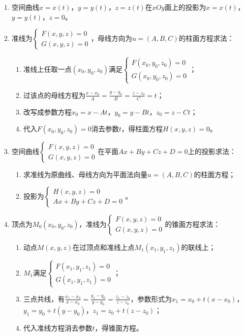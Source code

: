\documentclass[UTF8]{ctexart}
\theoremstyle{remark}
\begin{document}
\begin{enumerate}
\item 空间曲线$x=x(t)$，$y=y(t)$，$z=z(t)$在$xOy$面上的投影为$x=x(t)$，$y=y(t)$，$z=0$。

\item 准线为$\begin{cases}F(x, y, z)=0\\G(x, y, z)=0\end{cases}$，母线方向为$u=(A, B, C)$的柱面方程求法：
\begin{enumerate}
	\item 准线上任取一点$(x_0, y_0, z_0)$满足$\begin{cases}F(x_0, y_0, z_0)=0\\G(x_0, y_0, z_0)=0\end{cases}$；
	\item 过该点的母线方程为$\frac{x-x_0}{A}=\frac{y-y_0}{B}=\frac{z-z_0}{C}=t$；
	\item 改写成参数方程$x_0=x-At$，$y_0=y-Bt$，$z_0=z-Ct$；
	\item 代入$F(x_0, y_0, z_0)=0$消去参数$t$，得柱面方程$H(x, y, z)=0$。
\end{enumerate}

\item 空间曲线$\begin{cases}F(x, y, z)=0\\G(x, y, z)=0\end{cases}$在平面$Ax+By+Cz+D=0$上的投影求法：
\begin{enumerate}
	\item 求准线为原曲线、母线方向为平面法向量$u=(A, B, C)$的柱面方程；
	\item 投影为$\begin{cases}H(x, y, z)=0\\Ax+By+Cz+D=0\end{cases}$。
\end{enumerate}

\item 顶点为$M_0(x_0, y_0, z_0)$，准线为$\begin{cases}F(x, y, z)=0\\G(x, y, z)=0\end{cases}$的锥面方程求法：
\begin{enumerate}
	\item 动点$M(x, y, z)$在过顶点和准线上点$M_1(x_1, y_1, z_1)$的联线上；
	\item $M_1$满足$\begin{cases}F(x_1, y_1, z_1)=0\\G(x_1, y_1, z_1)=0\end{cases}$；
	\item 三点共线，有$\frac{x_1-x_0}{x-x_0}=\frac{y_1-y_0}{y-y_0}=\frac{z_1-z_0}{z-z_0}$，参数形式为$x_1=x_0+t(x-x_0)$，$y_1=y_0+t(y-y_0)$，$z_1=z_0+t(z-z_0)$；
	\item 代入准线方程消去参数$t$，得锥面方程。
\end{enumerate}


\end{enumerate}
\end{document}
